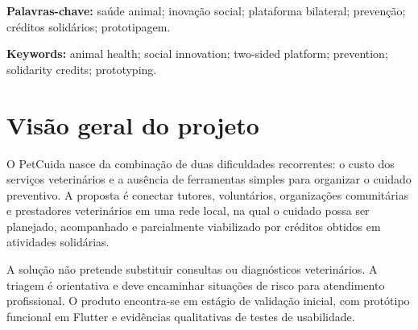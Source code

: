 \documentclass[12pt,a4paper]{article}
\begin{document}
\textbf{Palavras-chave:} saúde animal; inovação social; plataforma bilateral; prevenção; créditos solidários; prototipagem.
\newpage

\begin{abstract}
PetCuida is a mobile platform designed to expand access to preventive and lower-cost veterinary care. The solution integrates a vaccination and deworming schedule, digital medical records, non-diagnostic preliminary screening, a local network of service providers, and a "solidarity credits" mechanism. This document outlines the identification and validation of the problem, the value proposition, customer segmentation, the Business Model Canvas, a functional prototype, growth and scalability strategies, and a roadmap for next steps. Available evidence suggests an initial alignment between the solution and the pain points reported by pet owners; however, these findings remain exploratory—testing was conducted under controlled conditions, the sample size is small, and there is not yet any evidence regarding revenue, user retention, or willingness to pay.
\end{abstract}

\textbf{Keywords:} animal health; social innovation; two-sided platform; prevention; solidarity credits; prototyping.
\newpage

\tableofcontents
\newpage

\section{Visão geral do projeto}
O PetCuida nasce da combinação de duas dificuldades recorrentes: o custo dos serviços veterinários e a ausência de ferramentas simples para organizar o cuidado preventivo. A proposta é conectar tutores, voluntários, organizações comunitárias e prestadores veterinários em uma rede local, na qual o cuidado possa ser planejado, acompanhado e parcialmente viabilizado por créditos obtidos em atividades solidárias.

A solução não pretende substituir consultas ou diagnósticos veterinários. A triagem é orientativa e deve encaminhar situações de risco para atendimento profissional. O produto encontra-se em estágio de validação inicial, com protótipo funcional em Flutter e evidências qualitativas de testes de usabilidade.
\end{document}
